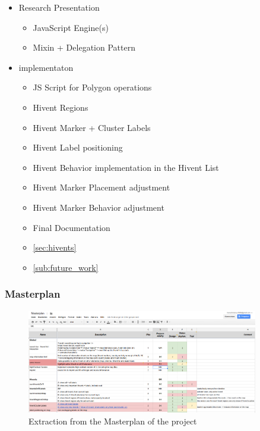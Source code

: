 \begin{itemize}
  \item Research Presentation
    \begin{itemize}
      \item JavaScript Engine(s)
      \item Mixin + Delegation Pattern
    \end{itemize}
  \item implementaton
  \begin{itemize}
     \item JS Script for Polygon operations
  \item Hivent Regions
  \item Hivent Marker + Cluster Labels
  \item Hivent Label positioning
  \item Hivent Behavior implementation in the Hivent List
  \item Hivent Marker Placement adjustment
  \item Hivent Marker Behavior adjustment
  \item Final Documentation
   \end{itemize} 
  \begin{itemize}
    \item \ref{sec:hivents}
    \item \ref{sub:future_work}
  \end{itemize}
\end{itemize}


\subsubsection{Masterplan} %
\label{ssub:masterplan}

\begin{figure}[H]
  \begin{center}
    \includegraphics[width=0.9\textwidth]{graphics/Masterplan.png}
  \end{center}
  \caption{Extraction from the Masterplan of the project}
  \label{fig:masterplan}
\end{figure}

